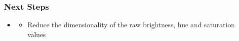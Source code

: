 \documentclass[10pt,aspectratio=169]{beamer}
\begin{document}
\begin{frame}
  \frametitle{Next Steps}
  \begin{itemize}
  \item[]
    \begin{itemize}
      \item Reduce the dimensionality of the raw brightness, hue and saturation values



\end{itemize}
\end{itemize}
\end{frame}
\end{document}
